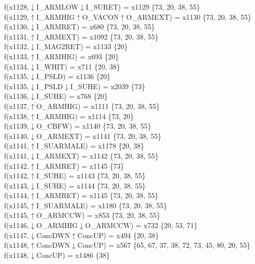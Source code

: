 f(x1128,$\downarrow$I\_ARMLOW$\downarrow$I\_SURET) = x1129 \{73, 20, 38, 55\} \\  
f(x1129,$\uparrow$I\_ARMHIG$\uparrow$O\_VACON$\uparrow$O\_ARMEXT) = x1130 \{73, 20, 38, 55\} \\  
f(x1130,$\downarrow$I\_ARMRET) = x680 \{73, 20, 38, 55\} \\  
f(x1131,$\uparrow$I\_ARMEXT) = x1092 \{73, 20, 38, 55\} \\  
f(x1132,$\downarrow$I\_MAG2RET) = x1133 \{20\} \\  
f(x1133,$\uparrow$I\_ARMHIG) = x693 \{20\} \\  
f(x1134,$\downarrow$I\_WHIT) = x711 \{20, 38\} \\  
f(x1135,$\downarrow$I\_PSLD) = x1136 \{20\} \\  
f(x1135,$\downarrow$I\_PSLD$\downarrow$I\_SUHE) = x2039 \{73\} \\  
f(x1136,$\downarrow$I\_SUHE) = x768 \{20\} \\  
f(x1137,$\uparrow$O\_ARMHIG) = x1111 \{73, 20, 38, 55\} \\  
f(x1138,$\uparrow$I\_ARMHIG) = x1114 \{73, 20\} \\  
f(x1139,$\downarrow$O\_CBFW) = x1140 \{73, 20, 38, 55\} \\  
f(x1140,$\downarrow$O\_ARMEXT) = x1141 \{73, 20, 38, 55\} \\  
f(x1141,$\uparrow$I\_SUARMALE) = x1178 \{20, 38\} \\  
f(x1141,$\downarrow$I\_ARMEXT) = x1142 \{73, 20, 38, 55\} \\  
f(x1142,$\uparrow$I\_ARMRET) = x1145 \{73\} \\  
f(x1142,$\uparrow$I\_SUHE) = x1143 \{73, 20, 38, 55\} \\  
f(x1143,$\downarrow$I\_SUHE) = x1144 \{73, 20, 38, 55\} \\  
f(x1144,$\uparrow$I\_ARMRET) = x1145 \{73, 20, 38, 55\} \\  
f(x1145,$\uparrow$I\_SUARMALE) = x1180 \{73, 20, 38, 55\} \\  
f(x1145,$\uparrow$O\_ARMCCW) = x853 \{73, 20, 38, 55\} \\  
f(x1146,$\downarrow$O\_ARMHIG$\downarrow$O\_ARMCCW) = x732 \{20, 53, 71\} \\  
f(x1147,$\downarrow$ConcDWN$\uparrow$ConcUP) = x494 \{20, 38\} \\  
f(x1148,$\uparrow$ConcDWN$\downarrow$ConcUP) = x567 \{65, 67, 37, 38, 72, 73, 45, 80, 20, 55\} \\  
f(x1148,$\downarrow$ConcUP) = x1486 \{38\} \\  
